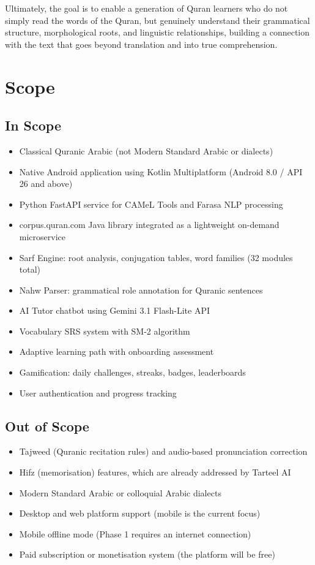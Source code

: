\documentclass[A4paper,12pt]{article}
\begin{document}
Ultimately, the goal is to enable a generation of Quran learners who do not simply read the words
of the Quran, but genuinely understand their grammatical structure, morphological roots, and
linguistic relationships, building a connection with the text that goes beyond translation and
into true comprehension.

\section{Scope}

\subsection*{In Scope}
\begin{itemize}[leftmargin=1.5em]
    \item Classical Quranic Arabic (not Modern Standard Arabic or dialects)
    \item Native Android application using Kotlin Multiplatform (Android 8.0 / API 26 and above)
    \item Python FastAPI service for CAMeL Tools and Farasa NLP processing
    \item corpus.quran.com Java library integrated as a lightweight on-demand microservice
    \item Sarf Engine: root analysis, conjugation tables, word families (32 modules total)
    \item Nahw Parser: grammatical role annotation for Quranic sentences
    \item AI Tutor chatbot using Gemini 3.1 Flash-Lite API
    \item Vocabulary SRS system with SM-2 algorithm
    \item Adaptive learning path with onboarding assessment
    \item Gamification: daily challenges, streaks, badges, leaderboards
    \item User authentication and progress tracking
\end{itemize}

\subsection*{Out of Scope}
\begin{itemize}[leftmargin=1.5em]
    \item Tajweed (Quranic recitation rules) and audio-based pronunciation correction
    \item Hifz (memorisation) features, which are already addressed by Tarteel AI
    \item Modern Standard Arabic or colloquial Arabic dialects
    \item Desktop and web platform support (mobile is the current focus)
    \item Mobile offline mode (Phase 1 requires an internet connection)
    \item Paid subscription or monetisation system (the platform will be free)
\end{itemize}
\end{document}
